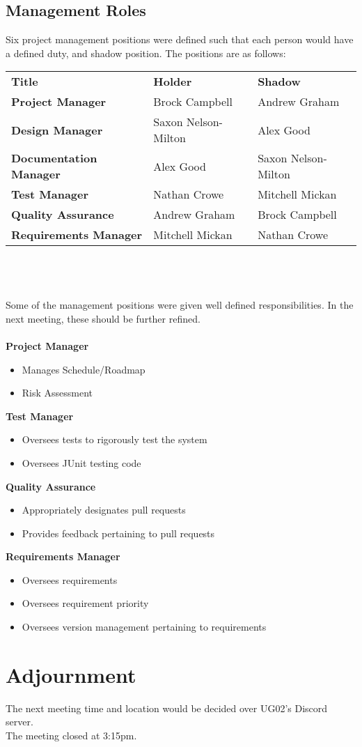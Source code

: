\documentclass[11pt, a4paper]{article}
\begin{document}
	\subsection{Management Roles}
	Six project management positions were defined such that each person would have a defined duty, and shadow position. The positions are as follows: \\
	\begin{tabular}{lll}
	\textbf{Title} & \textbf{Holder} & \textbf{Shadow} \\
	\textbf{Project Manager} & Brock Campbell & Andrew Graham \\
	\textbf{Design Manager} & Saxon Nelson-Milton & Alex Good \\
	\textbf{Documentation Manager} & Alex Good & Saxon Nelson-Milton \\
	\textbf{Test Manager} & Nathan Crowe & Mitchell Mickan \\
	\textbf{Quality Assurance} & Andrew Graham & Brock Campbell \\
	\textbf{Requirements Manager} & Mitchell Mickan & Nathan Crowe \\
	\end{tabular} \\ \\ \\
	Some of the management positions were given well defined responsibilities. In the next meeting, these should be further refined. \\ \\
	\textbf{Project Manager}
	\begin{itemize}
	\item Manages Schedule/Roadmap
	\item Risk Assessment
	\end{itemize}
	\textbf{Test Manager}
	\begin{itemize}
	\item Oversees tests to rigorously test the system
	\item Oversees JUnit testing code
	\end{itemize}
	\textbf{Quality Assurance}
	\begin{itemize}
	\item Appropriately designates pull requests
	\item Provides feedback pertaining to pull requests
	\end{itemize}
	\textbf{Requirements Manager}
	\begin{itemize}
	\item Oversees requirements
	\item Oversees requirement priority
	\item Oversees version management pertaining to requirements
	\end{itemize}
	 
\section{Adjournment}
	The next meeting time and location would be decided over 	UG02's Discord server. \\
	The meeting closed at 3:15pm.
\end{document}
